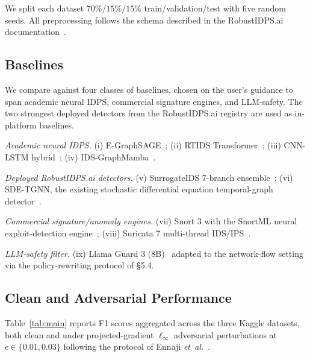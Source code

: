 \documentclass[journal,10pt]{IEEEtran}
\theoremstyle{definition}
\theoremstyle{remark}
\begin{document}
We split each dataset $70\%/15\%/15\%$ train/validation/test with
five random seeds. All preprocessing follows the schema described
in the RobustIDPS.ai documentation~\cite{robustidps_repo}.

\subsection{Baselines}\label{subsec:baselines}
We compare against four classes of baselines, chosen on the user's
guidance to span academic neural IDPS, commercial signature engines,
and LLM-safety. The two strongest deployed detectors from the
RobustIDPS.ai registry are used as in-platform baselines.

\emph{Academic neural IDPS.}
(i) E-GraphSAGE~\cite{lo2022egraphsage};
(ii) RTIDS Transformer~\cite{wu2022rtids};
(iii) CNN-LSTM hybrid~\cite{halbouni2022cnnlstm};
(iv) IDS-GraphMamba~\cite{mosaiyebzadeh2025graphmamba}.

\emph{Deployed RobustIDPS.ai detectors.}
(v) SurrogateIDS 7-branch ensemble~\cite{robustidps_repo};
(vi) SDE-TGNN, the existing stochastic differential equation
temporal-graph detector~\cite{robustidps_repo}.

\emph{Commercial signature/anomaly engines.}
(vii) Snort 3 with the SnortML neural exploit-detection
engine~\cite{snort3};
(viii) Suricata 7 multi-thread IDS/IPS~\cite{suricata7}.

\emph{LLM-safety filter.}
(ix) Llama Guard 3 (8B)~\cite{llamaguard3} adapted to the
network-flow setting via the policy-rewriting protocol of
\cite{llamaguard3} §5.4.

\subsection{Clean and Adversarial Performance}\label{subsec:clean}
Table~\ref{tab:main} reports F1 scores aggregated across the three
Kaggle datasets, both clean and under projected-gradient $\ell_\infty$
adversarial perturbations at $\epsilon\in\{0.01,0.03\}$ following the
protocol of Ennaji \textit{et~al.}~\cite{ennaji2024advsurvey}.
\end{document}
